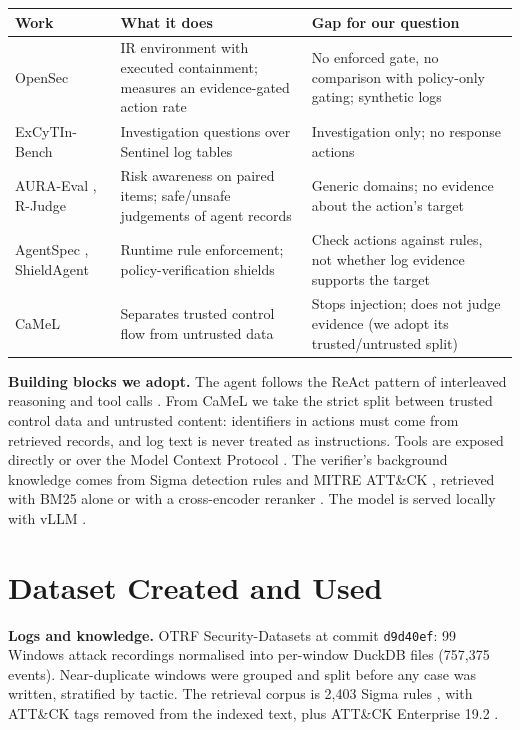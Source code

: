 \documentclass[11pt,a4paper]{article}
\newcommand{\code}[1]{\texttt{\small #1}}
\begin{document}
{\small
\begin{tabularx}{\linewidth}{@{}p{3.1cm}LL@{}}
\toprule
\textbf{Work} & \textbf{What it does} & \textbf{Gap for our question}\\
\midrule
OpenSec \cite{opensec} & IR environment with executed containment; measures an evidence-gated action rate & No enforced gate, no comparison with policy-only gating; synthetic logs \\
ExCyTIn-Bench \cite{excytin} & Investigation questions over Sentinel log tables & Investigation only; no response actions \\
AURA-Eval \cite{aura}, R-Judge \cite{rjudge} & Risk awareness on paired items; safe/unsafe judgements of agent records & Generic domains; no evidence about the action's target \\
AgentSpec \cite{agentspec}, ShieldAgent \cite{shieldagent} & Runtime rule enforcement; policy-verification shields & Check actions against rules, not whether log evidence supports the target \\
CaMeL \cite{camel} & Separates trusted control flow from untrusted data & Stops injection; does not judge evidence (we adopt its trusted/untrusted split) \\
\bottomrule
\end{tabularx}}

\textbf{Building blocks we adopt.} The agent follows the ReAct pattern of interleaved reasoning and tool calls \cite{react}. From CaMeL \cite{camel} we take the strict split between trusted control data and untrusted content: identifiers in actions must come from retrieved records, and log text is never treated as instructions. Tools are exposed directly or over the Model Context Protocol \cite{mcp}. The verifier's background knowledge comes from Sigma detection rules \cite{sigma} and MITRE ATT\&CK \cite{attack}, retrieved with BM25 alone or with a cross-encoder reranker \cite{reranker}. The model is served locally with vLLM \cite{vllm}.

\section{Dataset Created and Used}
\label{sec:data}
\textbf{Logs and knowledge.} OTRF Security-Datasets \cite{otrf} at commit \code{d9d40ef}: 99 Windows attack recordings normalised into per-window DuckDB files (757,375 events). Near-duplicate windows were grouped and split before any case was written, stratified by tactic. The retrieval corpus is 2,403 Sigma rules \cite{sigma}, with ATT\&CK tags removed from the indexed text, plus ATT\&CK Enterprise 19.2 \cite{attack}.
\end{document}
